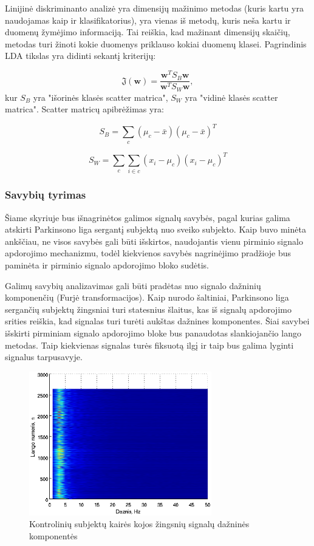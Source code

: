 \documentclass[10pt,onecolumn,draftcls]{IEEEtran}
\begin{document}
Linijinė diskriminanto analizė yra dimensijų mažinimo metodas (kuris
kartu yra naudojamas kaip ir klasifikatorius), yra vienas iš metodų,
kuris neša kartu ir duomenų žymėjimo informaciją. Tai reiškia, kad
mažinant dimensijų skaičių, metodas turi žinoti kokie duomenys
priklauso kokiai duomenų klasei. Pagrindinis LDA tikslas yra didinti
sekantį kriterijų:

\begin{equation}
  \mathfrak{J}(\mathbf{w}) = \frac{ \mathbf{w}^T S_B \mathbf{w} }{
    \mathbf{w}^T S_W \mathbf{w} },
\end{equation}
kur $S_B$ yra "išorinės klasės scatter matrica", $S_W$ yra "vidinė
klasės scatter matrica". Scatter matricų apibrėžimas yra:

\begin{equation}
  S_B = \sum_c (\mu_c - \bar{x})(\mu_c - \bar{x})^T
\end{equation}

\begin{equation}
  S_W = \sum_c \sum_{i \in c} ( x_i - \mu_c)(x_i - \mu_c)^T
\end{equation}

\subsubsection{Savybių tyrimas}

Šiame skyriuje bus išnagrinėtos galimos signalų savybės, pagal kurias
galima atskirti Parkinsono liga sergantį subjektą nuo sveiko
subjekto. Kaip buvo minėta ankščiau, ne visos savybės gali būti
išskirtos, naudojantis vienu pirminio signalo apdorojimo mechanizmu,
todėl kiekvienos savybės nagrinėjimo pradžioje bus paminėta ir
pirminio signalo apdorojimo bloko sudėtis.

Galimų savybių analizavimas gali būti pradėtas nuo signalo dažninių
komponenčių (Furjė transformacijos). Kaip nurodo šaltiniai, %
Parkinsono liga sergančių subjektų žingsniai turi statesnius šlaitus,
kas iš signalų apdorojimo srities reiškia, kad signalas turi turėti
aukštas dažnines komponentes. Šiai savybei išskirti pirminiam signalo
apdorojimo bloke bus panaudotas slankiojančio lango metodas. Taip
kiekvienas signalas turės fiksuotą ilgį ir taip bus galima lyginti
signalus tarpusavyje.

\begin{figure}[t]
  \centering
  \includegraphics[width=300px]{figures/co_fft.eps}
  \caption{Kontrolinių subjektų kairės kojos žingsnių signalų dažninės
  komponentės}
  \label{fig:co_fft}
\end{figure}
\end{document}
